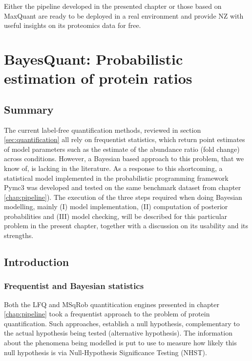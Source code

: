 \documentclass[11pt, a4paper]{report}
\begin{document}
Either the pipeline developed in the presented chapter or those based on MaxQuant are ready to be deployed in a real environment and provide \ac{NZ} with useful insights on its proteomics data for free.




\chapter{BayesQuant: Probabilistic estimation of protein ratios}
\label{chap:model}

\section*{Summary}

The current label-free quantification methods, reviewed in section \ref{sec:quantification} all rely on frequentist statistics, which return point estimates of model parameters such as the estimate of the abundance ratio (fold change) across conditions. However, a Bayesian based approach to this problem, that we know of, is lacking in the literature. As a response to this shortcoming, a statistical model implemented in the probabilistic programming framework Pymc3 was developed and tested on the same benchmark dataset from chapter \ref{chap:pipeline}). The execution of the three steps required when doing Bayesian modelling, mainly (I) model implementation, (II) computation of posterior probabilities and (III) model checking, will be described for this particular problem in the present chapter, together with a discussion on its usability and its strengths.

\section{Introduction}

\subsection{Frequentist and Bayesian statistics}

Both the LFQ and MSqRob quantitication engines presented in chapter \ref{chap:pipeline} took a frequentist approach to the problem of protein quantification. Such approaches, establish a null hypothesis, complementary to the actual hypothesis being tested (alternative hypothesis). The information about the phenomena being modelled is put to use to measure how likely this null hypothesis is via Null-Hypothesis Significance Testing (\ac{NHST}).
\end{document}
